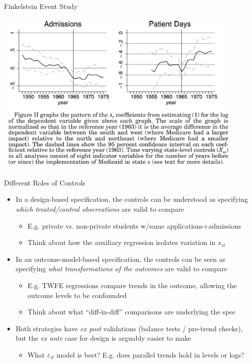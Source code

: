 \documentclass[11pt,english]{beamer}
\begin{document}
\begin{frame}{Finkelstein Event Study}
\vspace{-0.1cm}
\begin{center}
	\includegraphics[width=0.9\textwidth]{figures/fink.png}
\end{center}

\end{frame}



\begin{frame}{Different Roles of Controls}
\begin{itemize}
\item In a design-based specification, the controls can be understood as specifying \emph{which treated/control observations} are valid to compare\smallskip
\begin{itemize}
\item E.g. private vs. non-private students w/same applications+admissions\smallskip\pause{}
\item Think about how the auxiliary regression isolates variation in $x_{it}$
\end{itemize}\bigskip\pause{}

\item In an outcome-model-based specification, the controls can be seen as specifying \emph{what transformations of the outcomes} are valid to compare\smallskip
\begin{itemize}
\item E.g. TWFE regressions compare trends in the outcome, allowing the outcome levels to be confounded\smallskip\pause{}
\item Think about what ``diff-in-diff'' comparisons are underlying the spec
\end{itemize}\bigskip\pause{}
\item Both strategies have \emph{ex post} validations (balance tests / pre-trend checks), but the \emph{ex ante} case for design is arguably easier to make\smallskip
\begin{itemize}
\item What $\varepsilon_{it}$ model is best? E.g. does parallel trends hold in levels or logs?
\end{itemize}
\end{itemize}
\end{frame}
\end{document}
